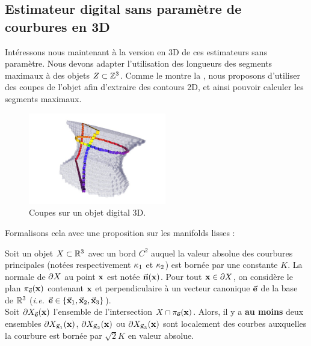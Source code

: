 \subsection{Estimateur digital sans paramètre de courbures en 3D}
%
Intéressons nous maintenant à la version en 3D de ces estimateurs sans paramètre.
Nous devons adapter l'utilisation des longueurs des segments maximaux à des
objets $Z \subset \mathbb{Z}^3$. Comme le montre la
, nous proposons d'utiliser des coupes de
l’objet afin d'extraire des contours 2D, et ainsi pouvoir calculer les segments
maximaux.
%
\begin{figure}[ht]
    \begin{center}
      \includegraphics[width=6cm]{images/Curvature/ctopo3dSurfelCut}
    \end{center}
    \caption[Coupes sur un objet digital 3D.]{Coupes sur un objet digital 3D.}
    \label{fig:3d-dig-object-slices}
\end{figure}
%
Formalisons cela avec une proposition sur les manifolds lisses :
%
\begin{proposition}
\label{prop:slices-3d}
  Soit un objet $X \subset \mathbb{R}^3$ avec un bord $C^2$ auquel la valeur
  absolue des courbures principales (notées respectivement $\kappa_{1}$ et
  $\kappa_{2}$) est bornée par une constante $K$. La normale de $\partial X$ au
  point $\mathbf{x}$ est notée $\vec{\mathbf{n}}(\mathbf{x})$. Pour tout $\mathbf{x} \in \partial X$, on
  considère le plan $\pi_{\vec{\mathbf{e}}}(\mathbf{x})$ contenant $\mathbf{x}$ et perpendiculaire à
  un vecteur canonique $\vec{\mathbf{e}}$ de la base de $\mathbb{R}^3$ (\emph{i.e.}
  $\vec{\mathbf{e}}\in\{ \vec{\mathbf{x}}_1, \vec{\mathbf{x}}_2, \vec{\mathbf{x}}_3 \}$).
  \\
  Soit $\partial X_{\vec{\mathbf{e}}}(\mathbf{x})$ l'ensemble de l'intersection $X
  \cap \pi_{\vec{\mathbf{e}}}(\mathbf{x})$. Alors, il y a \textbf{au moins} deux ensembles
  $\partial X_{\vec{\mathbf{x}}_1}(\mathbf{x})$, $\partial X_{\vec{\mathbf{x}}_2}(\mathbf{x})$ ou
  $\partial X_{\vec{\mathbf{x}}_3}(\mathbf{x})$ sont localement des courbes auxquelles la
  courbure est bornée par $\sqrt{2}K$ en valeur absolue.
\end{proposition}
